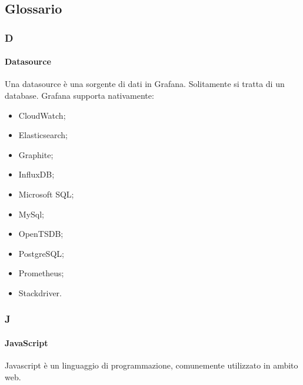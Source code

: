 \subsection{Glossario}
\subsubsection{D}

\paragraph{Datasource} \Spazio
\label{sec:datasource} 
Una datasource è una sorgente di dati in Grafana. Solitamente si tratta di un database. Grafana supporta nativamente:
	\begin{itemize}
	\item CloudWatch;
	\item Elasticsearch;
	\item Graphite;
	\item InfluxDB;
	\item Microsoft SQL;
	\item MySql;
	\item OpenTSDB;
	\item PostgreSQL;
	\item Prometheus;
	\item Stackdriver.
	\end{itemize}


\subsubsection{J}

	\paragraph{JavaScript} \Spazio
	\label{sec:javascript}
	Javascript è un linguaggio di programmazione, comunemente utilizzato in ambito web.